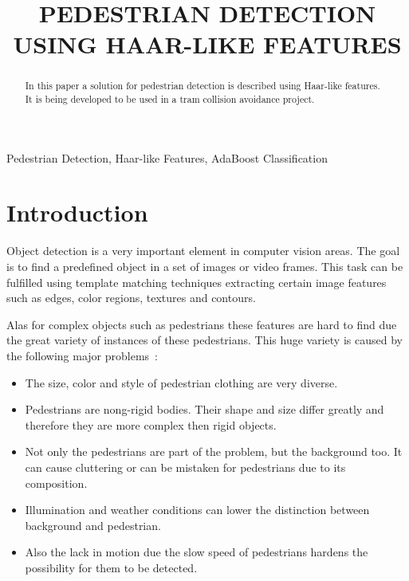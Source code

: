 \documentclass{article}
\title{PEDESTRIAN DETECTION USING HAAR-LIKE FEATURES}
\begin{document}
%
\maketitle
%
\begin{abstract}
In this paper a solution for pedestrian detection is described using Haar-like features. It is being developed to be used in a tram collision avoidance project. 
\end{abstract}
%
\begin{keywords}
Pedestrian Detection, Haar-like Features, AdaBoost Classification
\end{keywords}
%
\section{Introduction}
\label{sec:intro}

Object detection is a very important element in computer vision areas. The goal is to find a predefined object in a set of images or video frames. This task can be fulfilled using template matching techniques extracting certain image features such as edges, color regions, textures and contours.
\par
Alas for complex objects such as pedestrians these features are hard to find due the great variety of instances of these pedestrians. This huge variety is caused by the following major problems~\cite{monteiro2006vision}:

\begin{itemize}
\item The size, color and style of pedestrian clothing are very diverse.
\item Pedestrians are nong-rigid bodies. Their shape and size differ greatly and therefore they are more complex then rigid objects.
\item Not only the pedestrians are part of the problem, but the background too. It can cause cluttering or can be mistaken for pedestrians due to its composition.
\item Illumination and weather conditions can lower the distinction between background and pedestrian.
\item Also the lack in motion due the slow speed of pedestrians hardens the possibility for them to be detected.
\end{itemize}
\end{document}
